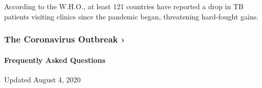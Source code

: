 According to the W.H.O., at least 121 countries have reported a drop in
TB patients visiting clinics since the pandemic began, threatening
hard-fought gains.

\href{https://www.nytimes.com/news-event/coronavirus?action=click\&pgtype=Article\&state=default\&region=MAIN_CONTENT_3\&context=storylines_faq}{}

\hypertarget{the-coronavirus-outbreak-}{%
\subsubsection{The Coronavirus Outbreak
›}\label{the-coronavirus-outbreak-}}

\hypertarget{frequently-asked-questions}{%
\paragraph{Frequently Asked
Questions}\label{frequently-asked-questions}}

Updated August 4, 2020

